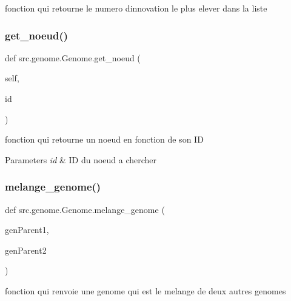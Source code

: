 fonction qui retourne le numero d\textquotesingle{}innovation le plus elever dans la liste 

\mbox{\label{classsrc_1_1genome_1_1_genome_a1e1498d4a1e288201aebca5bfeb38c40}} 
\subsubsection{\texorpdfstring{get\+\_\+noeud()}{get\_noeud()}}
{\footnotesize\ttfamily def src.\+genome.\+Genome.\+get\+\_\+noeud (\begin{DoxyParamCaption}\item[{}]{self,  }\item[{}]{id }\end{DoxyParamCaption})}



fonction qui retourne un noeud en fonction de son ID 


\begin{DoxyParams}{Parameters}
{\em id} & ID du noeud a chercher \\
\hline
\end{DoxyParams}
\mbox{\label{classsrc_1_1genome_1_1_genome_abf21abdd78ee72ce6b6ecf4cc698c435}} 
\subsubsection{\texorpdfstring{melange\+\_\+genome()}{melange\_genome()}}
{\footnotesize\ttfamily def src.\+genome.\+Genome.\+melange\+\_\+genome (\begin{DoxyParamCaption}\item[{}]{gen\+Parent1,  }\item[{}]{gen\+Parent2 }\end{DoxyParamCaption})\hspace{0.3cm}{\ttfamily [static]}}



fonction qui renvoie une genome qui est le melange de deux autres genomes 


